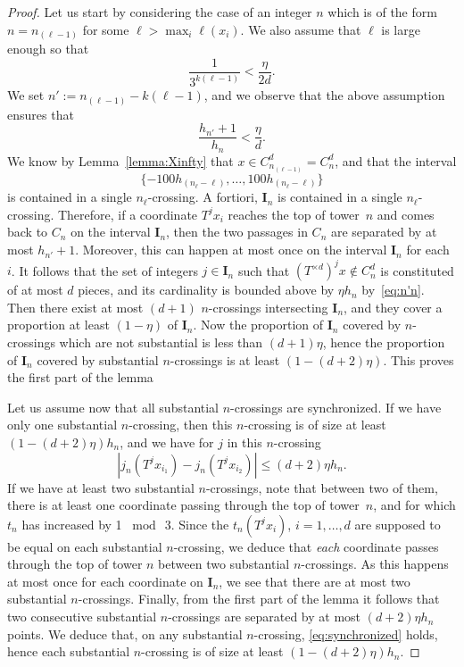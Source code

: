 \documentclass[AHL,Unicode,longabstracts]{cedram}
\newcommand{\egdef}{:=}
\newcommand{\cd}{C^{d}}
\newcommand{\td}{T^{\times d}}
\newcommand{\ci}{\boldsymbol I}
\begin{document}
\begin{proof}
Let us start by considering the case of an integer $n$ which is of the form $n=n_{(\ell-1)}$ for some $\ell>\max_i \ell(x_i)$. We also assume that $\ell$ is large enough so that
\[
\frac{1}{3^{k(\ell-1)}} < \frac{\eta}{2d}.
\]
We set $n'\egdef n_{(\ell-1)}-k(\ell-1)$, and we observe that the above assumption ensures that
\begin{equation}\label{eq:n'n}
\frac{h_{n'}+1}{h_n}< \frac{\eta}{d}.
\end{equation}
We know by Lemma~\ref{lemma:Xinfty} that $x\in \cd_{n_{(\ell-1)}}=\cd_n$, and that the interval
\[
\{-100 h_{(n_\ell-\ell)},\ldots,100 h_{(n_\ell-\ell)}\}
\]
is contained in a single $n_\ell$-crossing. A fortiori, $\ci_n$ is contained in a single $n_\ell$-crossing. Therefore, if a coordinate $T^jx_i$ reaches the top of tower~$n$ and comes back to $C_n$ on the interval $\ci_n$, then the two passages in $C_n$ are separated by at most $h_{n'}+1$. Moreover, this can happen at most once on the interval $\ci_n$ for each $i$. It follows that the set of integers $j\in\ci_n$ such that $(\td)^j x \notin \cd_n$ is constituted of at most $d$ pieces, and its cardinality is bounded above by $\eta h_n$ by~\eqref{eq:n'n}. Then there exist at most $(d+1)$ $n$-crossings intersecting $\ci_n$, and they cover a proportion at least $(1-\eta)$ of $\ci_n$. Now the proportion of $\ci_n$ covered by $n$-crossings which are not substantial is less than $(d+1)\eta$, hence the proportion of $\ci_n$ covered by substantial $n$-crossings is at least $(1-(d+2)\eta)$. This proves the first part of the lemma

Let us assume now that all substantial $n$-crossings are synchronized. If we have only one substantial $n$-crossing, then this $n$-crossing is of size at least $(1-(d+2)\eta) h_n$, and we have for $j$ in this $n$-crossing
\begin{equation}\label{eq:synchronized}
\left|j_n(T^j x_{i_1})-j_n(T^j x_{i_2})\right| \le (d+2)\eta h_n.
\end{equation}
If we have at least two substantial $n$-crossings, note that between two of them, there is at least one coordinate passing through the top of tower~$n$, and for which $t_n$ has increased by 1 $\bmod\ 3$. Since the $t_n(T^j x_i)$, $i=1,\ldots,d$ are supposed to be equal on each substantial $n$-crossing, we deduce that \emph{each} coordinate passes through the top of tower $n$ between two substantial $n$-crossings. As this happens at most once for each coordinate on $\ci_n$, we see that there are at most two substantial $n$-crossings. Finally, from the first part of the lemma it follows that two consecutive substantial $n$-crossings are separated by at most $(d+2)\eta h_n$ points. We deduce that, on any substantial $n$-crossing, \eqref{eq:synchronized} holds, hence each substantial $n$-crossing is of size at least $(1-(d+2)\eta) h_n$.
\end{proof}
\end{document}
